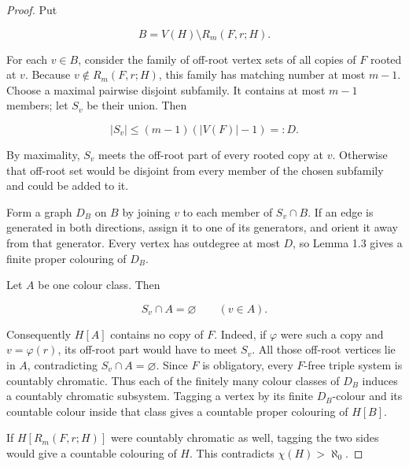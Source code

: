 \documentclass[a4paper,11pt,reqno]{amsart}
\theoremstyle{plain}
\theoremstyle{definition}
\theoremstyle{remark}
\begin{document}
\begin{proof}
Put

\[
B=V(H)\setminus R_m(F,r;H).
\]

For each \(v\in B\), consider the family of off-root vertex sets of all
copies of \(F\) rooted at \(v\). Because
\(v\notin R_m(F,r;H)\), this family has matching number at most \(m-1\).
Choose a maximal pairwise disjoint subfamily. It contains at most \(m-1\)
members; let \(S_v\) be their union. Then

\[
|S_v|\le(m-1)(|V(F)|-1)=:D.
\]

By maximality, \(S_v\) meets the off-root part of every rooted copy at \(v\).
Otherwise that off-root set would be disjoint from every member of the
chosen subfamily and could be added to it.

Form a graph \(D_B\) on \(B\) by joining \(v\) to each member of \(S_v\cap B\). If an edge is generated in both directions, assign it to one of its generators, and orient it away from that generator. Every vertex has outdegree at most \(D\), so Lemma 1.3 gives a finite proper colouring of \(D_B\).

Let \(A\) be one colour class. Then

\[
S_v\cap A=\varnothing\qquad(v\in A).
\]

Consequently \(H[A]\) contains no copy of \(F\). Indeed, if \(\varphi\) were such a copy and \(v=\varphi(r)\), its off-root part would have to meet \(S_v\). All those off-root vertices lie in \(A\), contradicting \(S_v\cap A=\varnothing\). Since \(F\) is obligatory, every \(F\)-free triple system is countably chromatic. Thus each of the finitely many colour classes of \(D_B\) induces a countably chromatic subsystem. Tagging a vertex by its finite \(D_B\)-colour and its countable colour inside that class gives a countable proper colouring of \(H[B]\).

If \(H[R_m(F,r;H)]\) were countably chromatic as well, tagging the two sides would give a countable colouring of \(H\). This contradicts \(\chi(H)>\aleph_0\).
\end{proof}
\end{document}
